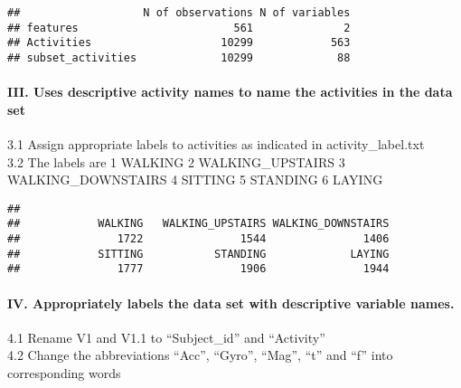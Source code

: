 \documentclass[
]{article}
\begin{document}
\begin{verbatim}
##                   N of observations N of variables
## features                        561              2
## Activities                    10299            563
## subset_activities             10299             88
\end{verbatim}

\hypertarget{iii.-uses-descriptive-activity-names-to-name-the-activities-in-the-data-set}{%
\paragraph{III. Uses descriptive activity names to name the activities
in the data
set}\label{iii.-uses-descriptive-activity-names-to-name-the-activities-in-the-data-set}}

3.1 Assign appropriate labels to activities as indicated in
activity\_label.txt\\
3.2 The labels are 1 WALKING 2 WALKING\_UPSTAIRS 3 WALKING\_DOWNSTAIRS 4
SITTING 5 STANDING 6 LAYING

\begin{verbatim}
## 
##            WALKING   WALKING_UPSTAIRS WALKING_DOWNSTAIRS 
##               1722               1544               1406 
##            SITTING           STANDING             LAYING 
##               1777               1906               1944
\end{verbatim}

\hypertarget{iv.-appropriately-labels-the-data-set-with-descriptive-variable-names.}{%
\paragraph{IV. Appropriately labels the data set with descriptive
variable
names.}\label{iv.-appropriately-labels-the-data-set-with-descriptive-variable-names.}}

4.1 Rename V1 and V1.1 to ``Subject\_id'' and ``Activity''\\
4.2 Change the abbreviations ``Acc'', ``Gyro'', ``Mag'', ``t'' and ``f''
into corresponding words
\end{document}
